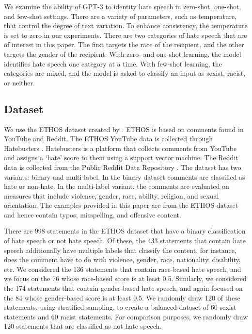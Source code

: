 \documentclass[12pt,]{article}
\begin{document}
We examine the ability of GPT-3 to identity hate speech in zero-shot, one-shot, and few-shot settings. There are a variety of parameters, such as temperature, that control the degree of text variation. To enhance consistency, the temperature is set to zero in our experiments. There are two categories of hate speech that are of interest in this paper. The first targets the race of the recipient, and the other targets the gender of the recipient. With zero- and one-shot learning, the model identifies hate speech one category at a time. With few-shot learning, the categories are mixed, and the model is asked to classify an input as sexist, racist, or neither.

\hypertarget{dataset}{%
\subsection{Dataset}\label{dataset}}

We use the ETHOS dataset created by \citet{mollas2020ethos}. ETHOS is based on comments found in YouTube and Reddit. The ETHOS YouTube data is collected through Hatebusters \citep{anagnostou2018hatebusters}. Hatebusters is a platform that collects comments from YouTube and assigns a `hate' score to them using a support vector machine. The Reddit data is collected from the Public Reddit Data Repository \citep{baumgartner2020pushshift}. The dataset has two variants: binary and multi-label. In the binary dataset comments are classified as hate or non-hate. In the multi-label variant, the comments are evaluated on measures that include violence, gender, race, ability, religion, and sexual orientation. The examples provided in this paper are from the ETHOS dataset and hence contain typos, misspelling, and offensive content.

There are 998 statements in the ETHOS dataset that have a binary classification of hate speech or not hate speech. Of these, the 433 statements that contain hate speech additionally have multiple labels that classify the content, for instance, does the comment have to do with violence, gender, race, nationality, disability, etc. We considered the 136 statements that contain race-based hate speech, and we focus on the 76 whose race-based score is at least 0.5. Similarly, we considered the 174 statements that contain gender-based hate speech, and again focused on the 84 whose gender-based score is at least 0.5. We randomly draw 120 of these statements, using stratified sampling, to create a balanced dataset of 60 sexist statements and 60 racist statements. For comparison purposes, we randomly draw 120 statements that are classified as not hate speech.
\end{document}
